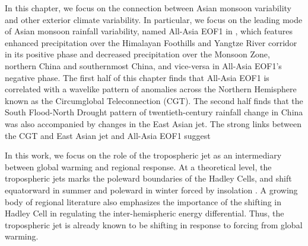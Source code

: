 	In this chapter, we focus on the connection between Asian monsoon variability and other exterior climate variability. In particular, we focus on the leading mode of Asian monsoon rainfall variability, named All-Asia EOF1 in \citet{Day2015}, which features enhanced precipitation over the Himalayan Foothills and Yangtze River corridor in its positive phase and decreased precipitation over the Monsoon Zone, northern China and southernmost China, and vice-versa in All-Asia EOF1's negative phase. The first half of this chapter finds that All-Asia EOF1 is correlated with a wavelike pattern of anomalies across the Northern Hemisphere known as the Circumglobal Teleconnection (CGT). The second half finds that the South Flood-North Drought pattern of twentieth-century rainfall change in China was also accompanied by changes in the East Asian jet. The strong links between the CGT and East Asian jet and All-Asia EOF1 suggest 

	In this work, we focus on the role of the tropospheric jet as an intermediary between global warming and regional response. At a theoretical level, the tropospheric jets marks the poleward boundaries of the Hadley Cells, and shift equatorward in summer and poleward in winter forced by insolation \citep{Bordoni2008}. A growing body of regional literature also emphasizes the importance of the shifting in Hadley Cell in regulating the inter-hemispheric energy differential. Thus, the tropospheric jet is already known to be shifting in response to forcing from global warming.


